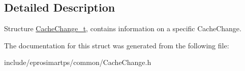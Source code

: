 \subsection{\-Detailed \-Description}
\-Structure \hyperlink{structeprosima_1_1rtps_1_1_cache_change__t}{\-Cache\-Change\-\_\-t}, contains information on a specific \-Cache\-Change. 

\-The documentation for this struct was generated from the following file\-:\begin{DoxyCompactItemize}
\item 
include/eprosimartps/common/\-Cache\-Change.\-h\end{DoxyCompactItemize}
